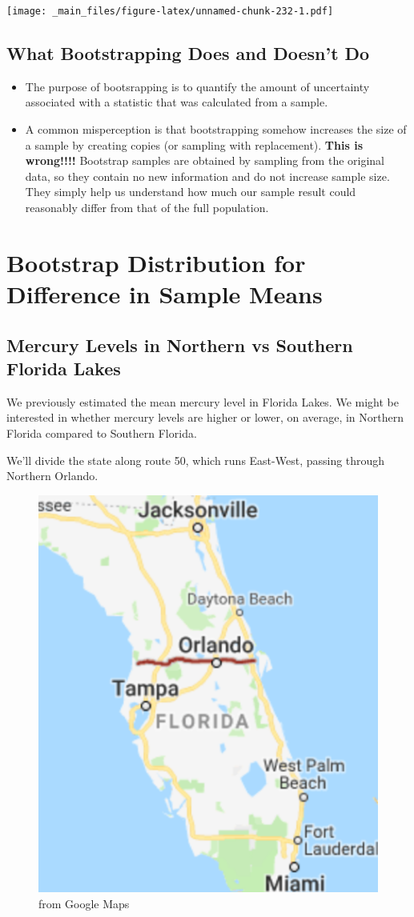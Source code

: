 \documentclass[]{book}
\begin{document}
\texttt{[image: \_main\_files/figure-latex/unnamed-chunk-232-1.pdf]}

\subsection{What Bootstrapping Does and Doesn't
Do}\label{what-bootstrapping-does-and-doesnt-do}

\begin{itemize}
\item
  The purpose of bootsrapping is to quantify the amount of uncertainty
  associated with a statistic that was calculated from a sample.
\item
  A common misperception is that bootstrapping somehow increases the
  size of a sample by creating copies (or sampling with replacement).
  \textbf{This is wrong!!!!} Bootstrap samples are obtained by sampling
  from the original data, so they contain no new information and do not
  increase sample size. They simply help us understand how much our
  sample result could reasonably differ from that of the full
  population.
\end{itemize}

\section{Bootstrap Distribution for Difference in Sample
Means}\label{bootstrap-distribution-for-difference-in-sample-means}

\subsection{Mercury Levels in Northern vs Southern Florida
Lakes}\label{mercury-levels-in-northern-vs-southern-florida-lakes}

We previously estimated the mean mercury level in Florida Lakes. We
might be interested in whether mercury levels are higher or lower, on
average, in Northern Florida compared to Southern Florida.

We'll divide the state along route 50, which runs East-West, passing
through Northern Orlando.

\begin{figure}
\includegraphics[width=0.3\linewidth]{Florida} \caption{from Google Maps}\label{fig:unnamed-chunk-233}
\end{figure}
\end{document}
